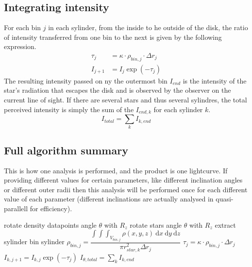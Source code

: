 \documentclass[a4paper, 12pt, english, titlepage]{article}
\newcommand{\D}[1]{\ \mathrm{d}#1} %
\begin{document}
\subsection{Integrating intensity}
    For each bin $j$ in each sylinder, from the inside to he outside of the disk, the ratio of intensity transferred from one bin to the next is given by the following expression.
    \begin{align*}
        \tau_j &= \kappa \cdot \rho_{bin,j} \cdot \Delta r_j \\
        I_{j+1} &= I_j \exp(-\tau_j)
    \end{align*}
    The resulting intensity passed on ny the outermost bin $I_{end}$ is the intensity of the star's radiation that escapes the disk and is observed by the observer on the current line of sight. If there are several stars and thus several sylindres, the total perceived intensity is simply the sum of the $I_{end,k}$ for each sylinder $k$.
    $$
    I_{total} = \sum_k I_{k,end}
    $$

\subsection{Full algorithm summary}
    This is how one analysis is performed, and the product is one lightcurve. If providing different values for certain parameters, like different inclination angles or different outer radii then this analysis will be performed once for each different value of each parameter (different inclinations are actually analysed in quasi-parallell for efficiency).
    \begin{algorithmic}
            \STATE rotate density datapoints angle $\theta$ with $R_z$
            \STATE rotate stars angle $\theta$ with $R_z$
                \STATE extract sylinder
                \STATE bin sylinder
                    \STATE $\rho_{bin,j} =
                        \dfrac{\int\int\int_{V_{bin,j}} \rho(x,y,z) \D{x}\D{y}\D{z}}
                        {\pi r_{star,k}^2 \Delta r_j}$
                    \STATE $\tau_j = \kappa \cdot \rho_{bin,j} \cdot \Delta r_j$
                    \STATE $I_{k,j+1} = I_{k,j} \exp(-\tau_j)$
                \ENDFOR
            \ENDFOR
            \STATE $I_{\theta,total} = \sum_k I_{k,end}$
        \ENDFOR
    \end{algorithmic}
\end{document}
